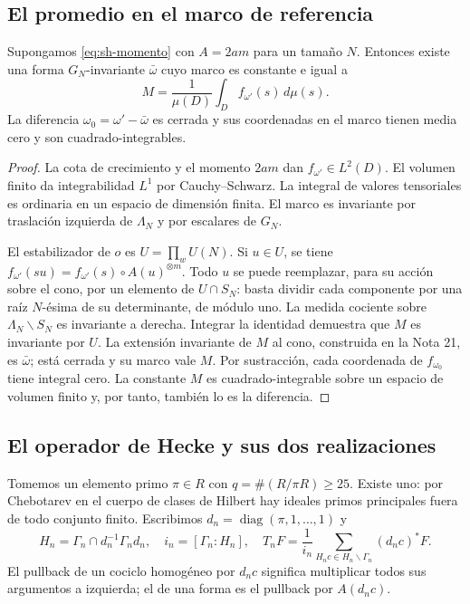 \subsection{El promedio en el marco de referencia}

\begin{proposicion}
\label{prop:sh-media}
Supongamos \eqref{eq:sh-momento} con $A=2am$ para un tamaño $N$. Entonces existe una forma $G_N$-invariante $\bar\omega$ cuyo marco es constante e igual a
\begin{equation}
 M=\frac{1}{\mu(D)}\int_D f_{\omega'}(s)\,d\mu(s).
 \label{eq:sh-media}
\end{equation}
La diferencia $\omega_0=\omega'-\bar\omega$ es cerrada y sus coordenadas en el marco tienen media cero y son cuadrado-integrables.
\end{proposicion}
\begin{proof}
La cota de crecimiento y el momento $2am$ dan $f_{\omega'}\in L^2(D)$. El volumen finito da integrabilidad $L^1$ por Cauchy--Schwarz. La integral de valores tensoriales es ordinaria en un espacio de dimensión finita. El marco es invariante por traslación izquierda de $\Lambda_N$ y por escalares de $G_N$.

El estabilizador de $o$ es $U=\prod_w U(N)$. Si $u\in U$, se tiene $f_{\omega'}(su)=f_{\omega'}(s)\circ A(u)^{\otimes m}$. Todo $u$ se puede reemplazar, para su acción sobre el cono, por un elemento de $U\cap S_N$: basta dividir cada componente por una raíz $N$-ésima de su determinante, de módulo uno. La medida cociente sobre $\Lambda_N\backslash S_N$ es invariante a derecha. Integrar la identidad demuestra que $M$ es invariante por $U$. La extensión invariante de $M$ al cono, construida en la Nota 21, es $\bar\omega$; está cerrada y su marco vale $M$. Por sustracción, cada coordenada de $f_{\omega_0}$ tiene integral cero. La constante $M$ es cuadrado-integrable sobre un espacio de volumen finito y, por tanto, también lo es la diferencia.
\end{proof}

\subsection{El operador de Hecke y sus dos realizaciones}

Tomemos un elemento primo $\pi\in R$ con $q=\#(R/\pi R)\ge25$. Existe uno: por Chebotarev en el cuerpo de clases de Hilbert hay ideales primos principales fuera de todo conjunto finito. Escribimos $d_n=\operatorname{diag}(\pi,1,\ldots,1)$ y
\begin{equation}
 H_n=\Gamma_n\cap d_n^{-1}\Gamma_n d_n,\quad
 i_n=[\Gamma_n:H_n],\quad
 T_nF=\frac{1}{i_n}\sum_{H_nc\in H_n\backslash\Gamma_n}(d_nc)^*F.
 \label{eq:sh-hecke}
\end{equation}
El pullback de un cociclo homogéneo por $d_nc$ significa multiplicar todos sus argumentos a izquierda; el de una forma es el pullback por $A(d_nc)$.

